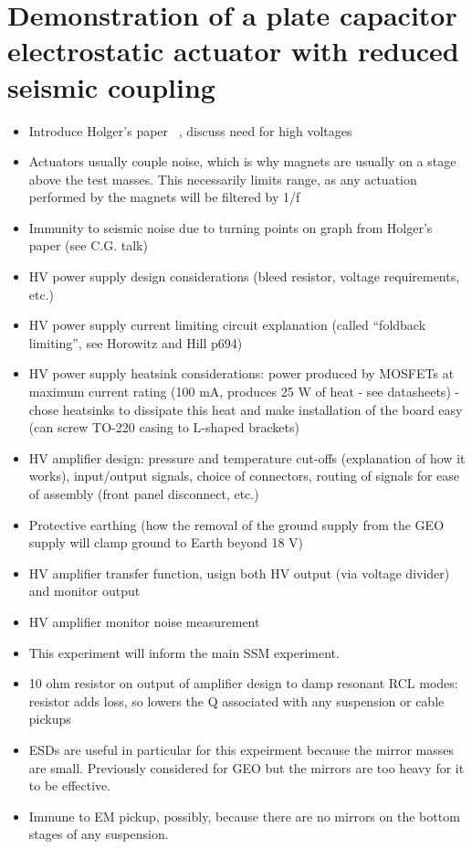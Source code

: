 \chapter{\label{c:esd-concept}Demonstration of a plate capacitor electrostatic actuator with reduced seismic coupling}

\begin{itemize}
  \item Introduce Holger's paper~\cite{Wittel2015} \etal{}, discuss need for high voltages
  \item Actuators usually couple noise, which is why magnets are usually on a stage above the test masses. This necessarily limits range, as any actuation performed by the magnets will be filtered by 1/f
  \item Immunity to seismic noise due to turning points on graph from Holger's paper (see C.G. talk)
  \item HV power supply design considerations (bleed resistor, voltage requirements, etc.)
  \item HV power supply current limiting circuit explanation (called ``foldback limiting'', see Horowitz and Hill p694)
  \item HV power supply heatsink considerations: power produced by MOSFETs at maximum current rating (100 mA, produces 25 W of heat - see datasheets) - chose heatsinks to dissipate this heat and make installation of the board easy (can screw TO-220 casing to L-shaped brackets)
  \item HV amplifier design: pressure and temperature cut-offs (explanation of how it works), input/output signals, choice of connectors, routing of signals for ease of assembly (front panel disconnect, etc.)
  \item Protective earthing (how the removal of the ground supply from the GEO supply will clamp ground to Earth beyond 18 V)
  \item HV amplifier transfer function, usign both HV output (via voltage divider) and monitor output
  \item HV amplifier monitor noise measurement
  \item This experiment will inform the main SSM experiment.
  \item 10 ohm resistor on output of amplifier design to damp resonant RCL modes: resistor adds loss, so lowers the Q associated with any suspension or cable pickups
  \item ESDs are useful in particular for this expeirment because the mirror masses are small. Previously considered for GEO but the mirrors are too heavy for it to be effective.
  \item Immune to EM pickup, possibly, because there are no mirrors on the bottom stages of any suspension.


\end{itemize}
